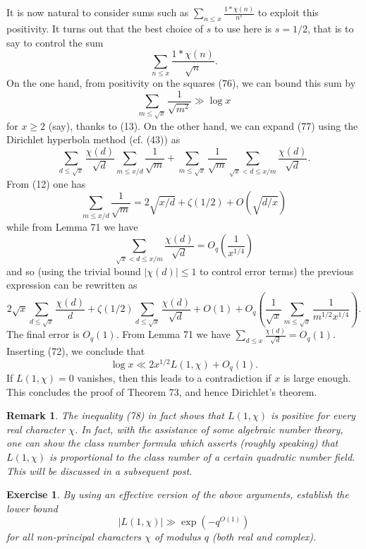 \documentclass[10pt,reqno]{amsart}
\newtheorem{exercise}[theorem]{Exercise}
\newtheorem{remark}[theorem]{Remark}
\begin{document}
It is now natural to consider sums such as $\sum_{n \leq x} \frac{1*\chi(n)}{n^s}$ to exploit this positivity. It turns out that the best choice of $s$ to use here is $s=1/2$, that is to say to control the sum
%
\begin{equation}   \sum_{n \leq x} \frac{1*\chi(n)}{\sqrt{n}}. \end{equation}
%
On the one hand, from positivity on the squares (76), we can bound this sum by
%
\[  \sum_{m \leq \sqrt{x}} \frac{1}{\sqrt{m^2}} \gg \log x \]
%
for $x \geq 2$ (say), thanks to (13). On the other hand, we can expand (77) using the Dirichlet hyperbola method (cf. (43)) as
%
\[  \sum_{d \leq \sqrt{x}} \frac{\chi(d)}{\sqrt{d}} \sum_{m \leq x/d} \frac{1}{\sqrt{m}} + \sum_{m \leq \sqrt{x}} \frac{1}{\sqrt{m}} \sum_{\sqrt{x} < d \leq x/m} \frac{\chi(d)}{\sqrt{d}}.\]
%
From (12) one has
%
\[  \sum_{m \leq x/d} \frac{1}{\sqrt{m}} = 2 \sqrt{x/d} + \zeta(1/2) + O( \sqrt{d/x} ) \]
%
while from Lemma 71 we have
%
\[ \sum_{\sqrt{x} < d \leq x/m} \frac{\chi(d)}{\sqrt{d}} = O_q(\frac{1}{x^{1/4}})\]
%
and so (using the trivial bound $|\chi(d)| \leq 1$ to control error terms) the previous expression can be rewritten as
%
\[  2 \sqrt{x} \sum_{d \leq \sqrt{x}} \frac{\chi(d)}{d} + \zeta(1/2) \sum_{d \leq \sqrt{x}} \frac{\chi(d)}{\sqrt{d}} + O( 1 ) + O_q( \frac{1}{\sqrt{x}} \sum_{m \leq \sqrt{x}} \frac{1}{m^{1/2} x^{1/4}} ).\]
%
The final error is $O_q(1)$. From Lemma 71 we have $\sum_{d \leq x} \frac{\chi(d)}{\sqrt{d}} = O_q(1)$. Inserting (72), we conclude that
%
\begin{equation}   \log x \ll 2 x^{1/2} L(1,\chi) + O_q(1). \end{equation}
%
If $L(1,\chi) = 0$ vanishes, then this leads to a contradiction if $x$ is large enough. This concludes the proof of Theorem 73, and hence Dirichlet’s theorem.

\begin{remark}
    The inequality (78) in fact shows that $L(1,\chi)$ is positive for every real character $\chi$. In fact, with the assistance of some algebraic number theory, one can show the \emph{class number formula} which asserts (roughly speaking) that $L(1,\chi)$ is proportional to the class number of a certain quadratic number field. This will be discussed in a subsequent post.
\end{remark}

\begin{exercise}
    By using an effective version of the above arguments, establish the lower bound
    \begin{equation}   |L(1,\chi)| \gg \exp( - q^{O(1)} ) \end{equation}
    for all non-principal characters $\chi$ of modulus $q$ (both real and complex).
\end{exercise}
\end{document}

